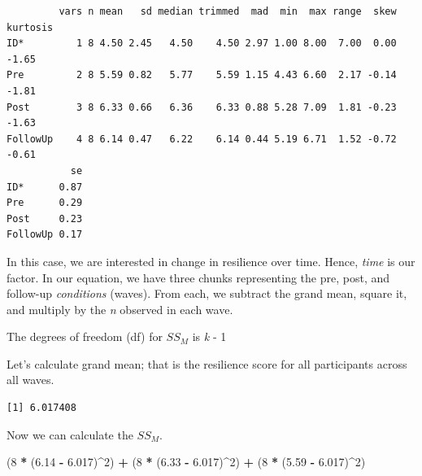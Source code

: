\documentclass[
  11pt,
]{book}
\newenvironment{Shaded}{\begin{snugshade}}{\end{snugshade}}
\newcommand{\DecValTok}[1]{\textcolor[rgb]{0.06,0.06,0.06}{#1}}
\newcommand{\FloatTok}[1]{\textcolor[rgb]{0.06,0.06,0.06}{#1}}
\newcommand{\FunctionTok}[1]{\textcolor[rgb]{0.27,0.27,0.27}{\textbf{#1}}}
\newcommand{\NormalTok}[1]{#1}
\newcommand{\SpecialCharTok}[1]{\textcolor[rgb]{0.43,0.43,0.43}{\textbf{#1}}}
\begin{document}
\begin{verbatim}
         vars n mean   sd median trimmed  mad  min  max range  skew kurtosis
ID*         1 8 4.50 2.45   4.50    4.50 2.97 1.00 8.00  7.00  0.00    -1.65
Pre         2 8 5.59 0.82   5.77    5.59 1.15 4.43 6.60  2.17 -0.14    -1.81
Post        3 8 6.33 0.66   6.36    6.33 0.88 5.28 7.09  1.81 -0.23    -1.63
FollowUp    4 8 6.14 0.47   6.22    6.14 0.44 5.19 6.71  1.52 -0.72    -0.61
           se
ID*      0.87
Pre      0.29
Post     0.23
FollowUp 0.17
\end{verbatim}

In this case, we are interested in change in resilience over time. Hence, \emph{time} is our factor. In our equation, we have three chunks representing the pre, post, and follow-up \emph{conditions} (waves). From each, we subtract the grand mean, square it, and multiply by the \emph{n} observed in each wave.

The degrees of freedom (df) for \(SS_M\) is \emph{k} - 1

Let's calculate grand mean; that is the resilience score for all participants across all waves.

\begin{Shaded}
\end{Shaded}

\begin{verbatim}
[1] 6.017408
\end{verbatim}

Now we can calculate the \(SS_M\).

\begin{Shaded}
\begin{Highlighting}[]
\NormalTok{(}\DecValTok{8} \SpecialCharTok{*}\NormalTok{ (}\FloatTok{6.14} \SpecialCharTok{{-}} \FloatTok{6.017}\NormalTok{)}\SpecialCharTok{\^{}}\DecValTok{2}\NormalTok{) }\SpecialCharTok{+}\NormalTok{ (}\DecValTok{8} \SpecialCharTok{*}\NormalTok{ (}\FloatTok{6.33} \SpecialCharTok{{-}} \FloatTok{6.017}\NormalTok{)}\SpecialCharTok{\^{}}\DecValTok{2}\NormalTok{) }\SpecialCharTok{+}\NormalTok{ (}\DecValTok{8} \SpecialCharTok{*}\NormalTok{ (}\FloatTok{5.59} \SpecialCharTok{{-}} \FloatTok{6.017}\NormalTok{)}\SpecialCharTok{\^{}}\DecValTok{2}\NormalTok{)}
\end{Highlighting}
\end{Shaded}
\end{document}
